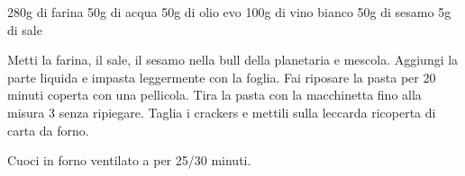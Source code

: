 \begin{ingreds}
	280g di farina
	50g di acqua
	50g di olio evo 
	100g di vino bianco
	50g di sesamo
	5g di sale
\end{ingreds}

\begin{method}
	Metti la farina, il sale, il sesamo nella bull della planetaria e mescola. Aggiungi la parte liquida e impasta leggermente con la foglia. Fai riposare la pasta per 20 minuti coperta con una pellicola.
	Tira la pasta con la macchinetta fino alla misura 3 senza ripiegare. Taglia i crackers e mettili sulla leccarda ricoperta di carta da forno.

	Cuoci in forno ventilato a  per 25/30 minuti.
\end {method}

